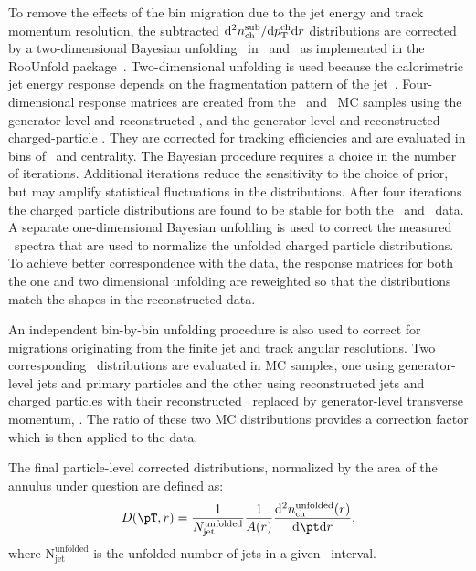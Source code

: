 To remove the effects of the bin migration due to the jet energy and track momentum resolution, the subtracted $\mathrm{d}^2 \mbox{$n_{\mathrm{ch}}^{\mathrm{sub}}$} /\mathrm{d}\mbox{$p_{\mathrm{T}}^{\mathrm{ch}}$} \mathrm{d} r$ distributions are corrected by a two-dimensional Bayesian unfolding~\cite{DAgostini:1994zf}
in \pttrk\ and \ptjet\ as implemented in the RooUnfold package~\cite{Adye:2011gm}.  
Two-dimensional unfolding is used because the calorimetric jet energy response depends on the fragmentation pattern of the jet~\cite{Aad:2011he}.
Four-dimensional response matrices are created from the \pp\ and \pbpb\ MC samples using the generator-level and reconstructed \ptjet, and the generator-level and reconstructed charged-particle \pttrk. They are corrected for tracking efficiencies and are evaluated in bins of \rvar\ and centrality. The Bayesian procedure requires a choice in the number of iterations.
Additional iterations reduce the sensitivity to the choice of prior, but may
amplify statistical fluctuations in the distributions.
After four iterations the 
charged particle distributions are found to be stable for both the \PbPb\ and \pp\ data.
A separate one-dimensional Bayesian unfolding is used to correct the measured \ptjet\ spectra that are used to normalize the unfolded charged particle distributions.
To achieve better correspondence with the data, the response matrices for both the one and two dimensional unfolding are reweighted so that the distributions match the shapes in the reconstructed data.

An independent bin-by-bin unfolding procedure is also used to correct for migrations originating from the finite jet and track angular resolutions. Two corresponding \Dptr\ distributions are evaluated in MC samples, one using generator-level jets and primary particles and the other using reconstructed jets and charged particles with their reconstructed \pttrk\ replaced by generator-level transverse momentum, \pTtrue. The ratio of these two MC distributions provides a correction factor which is then applied to the data. 

The final particle-level corrected distributions, normalized by the area of the annulus under question are defined as:
\begin{eqnarray}
 \label{eq:Dpt}
   \Dptr = \frac{1}{N_\mathrm{jet}^\mathrm{unfolded}} \frac{1}{A(r)} \frac{\fd^2 \nchunf(r)}{\fd \pt \fd r},
 \end{eqnarray}
where $\text{N}_{\text{jet}}^{\text{unfolded}}$ is the unfolded number of jets in a given \ptjet\ interval.

